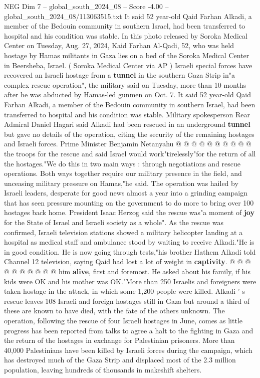 \begin{textsample}{NEG Dim 7 – global\_south\_2024\_08 – Score -4.00 – global\_south\_2024\_08/113063515.txt}  \label{ex:f7_neg_380}
It said 52 year-old Qaid Farhan Alkadi, a member of the Bedouin community in southern Israel, had been transferred to hospital and his condition was stable.
In this photo released by Soroka Medical Center on Tuesday, Aug. 27, 2024, Kaid Farhan Al-Qadi, 52, who was held hostage by Hamas militants in Gaza lies on a bed of the Soroka Medical Center in Beersheba, Israel. ( Soroka Medical Center via AP ) Israeli special forces have recovered an Israeli hostage from a \textbf{tunnel} in the southern Gaza Strip in"a complex rescue operation", the military said on Tuesday, more than 10 months after he was abducted by Hamas-led gunmen on Oct. 7.
It said 52 year-old Qaid Farhan Alkadi, a member of the Bedouin community in southern Israel, had been transferred to hospital and his condition was stable.
Military spokesperson Rear Admiral Daniel Hagari said Alkadi had been rescued in an underground \textbf{tunnel} but gave no details of the operation, citing the security of the remaining hostages and Israeli forces.
Prime Minister Benjamin Netanyahu @ @ @ @ @ @ @ @ @ @ the troops for the rescue and said Israel would work"tirelessly"for the return of all the hostages."We do this in two main ways : through negotiations and rescue operations.
Both ways together require our military presence in the field, and unceasing military pressure on Hamas,"he said.
The operation was hailed by Israeli leaders, desperate for good news almost a year into a grinding campaign that has seen pressure mounting on the government to do more to bring over 100 hostages back home.
President Isaac Herzog said the rescue was"a moment of \textbf{joy} for the State of Israel and Israeli society as a whole".
As the rescue was confirmed, Israeli television stations showed a military helicopter landing at a hospital as medical staff and ambulance stood by waiting to receive Alkadi."He is in good condition.
He is now going through tests,"his brother Hathem Alkadi told Channel 12 television, saying Qaid had lost a lot of weight in \textbf{captivity}. @ @ @ @ @ @ @ @ @ @ him \textbf{alive}, first and foremost.
He asked about his family, if his kids were OK and his mother was OK."More than 250 Israelis and foreigners were taken hostage in the attack, in which some 1,200 people were killed.
Alkadi ' s rescue leaves 108 Israeli and foreign hostages still in Gaza but around a third of these are known to have died, with the fate of the others unknown.
The operation, following the rescue of four Israeli hostages in June, comes as little progress has been reported from talks to agree a halt to the fighting in Gaza and the return of the hostages in exchange for Palestinian prisoners.
More than 40,000 Palestinians have been killed by Israeli forces during the campaign, which has destroyed much of the Gaza Strip and displaced most of the 2.3 million population, leaving hundreds of thousands in makeshift shelters.

\end{textsample}
